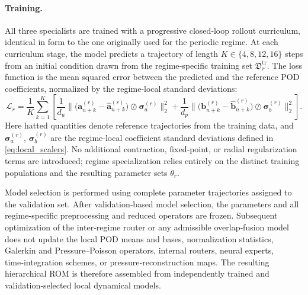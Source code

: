 \paragraph{Training.}
All three specialists are trained with a progressive closed‑loop rollout
curriculum, identical in form to the one originally used for the
periodic regime.  At each curriculum stage, the model predicts a
trajectory of length $K\in\{4,8,12,16\}$ steps from an initial condition
drawn from the regime‑specific training set $\mathfrak{D}_{r}^{\mathrm{tr}}$.
The loss function is the mean squared error between the predicted and
the reference POD coefficients, normalized by the regime‑local standard
deviations:
\begin{equation}
  \mathcal{L}_{r}
  =
  \frac{1}{K}\sum_{k=1}^{K}
  \left[
    \frac{1}{d_u}
    \bigl\|
      \bigl(
        \boldsymbol{a}^{(r)}_{n+k} - \widehat{\boldsymbol{a}}^{(r)}_{n+k}
      \bigr)
      \oslash
      \boldsymbol{\sigma}^{(r)}_a
    \bigr\|_2^2
    +
    \frac{1}{d_p}
    \bigl\|
      \bigl(
        \boldsymbol{b}^{(r)}_{n+k} - \widehat{\boldsymbol{b}}^{(r)}_{n+k}
      \bigr)
      \oslash
      \boldsymbol{\sigma}^{(r)}_b
    \bigr\|_2^2
  \right].
  \label{eq:unified_rollout_loss}
\end{equation}
Here hatted quantities denote reference trajectories from the training
data, and $\boldsymbol{\sigma}^{(r)}_a$, $\boldsymbol{\sigma}^{(r)}_b$ are
the regime‑local coefficient standard deviations defined in
\eqref{eq:local_scalers}.  No additional contraction, fixed‑point, or
radial regularization terms are introduced; regime specialization relies
entirely on the distinct training populations and the resulting
parameter sets $\theta_r$.





Model selection is performed using complete parameter trajectories
assigned to the validation set.  After validation‑based model selection, the parameters and all
regime‑specific preprocessing and reduced operators are frozen.
Subsequent optimization of the inter‑regime router or any admissible
overlap‑fusion model does not update the local POD means and bases,
normalization statistics, Galerkin and Pressure–Poisson operators,
internal routers, neural experts, time‑integration schemes, or
pressure‑reconstruction maps.  The resulting hierarchical ROM is
therefore assembled from independently trained and validation‑selected
local dynamical models. 
